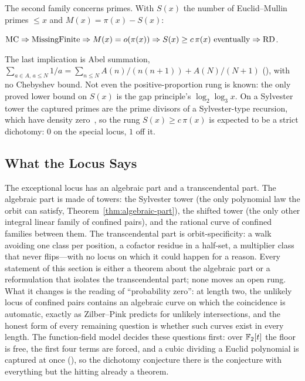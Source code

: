 The second family concerns primes.  With $S(x)$ the number of
Euclid--Mullin primes $\leq x$ and $M(x) = \pi(x) - S(x)$:

\begin{theorem}
\label{thm:coverage-ladder}
$\mathrm{MC} \Rightarrow \mathrm{MissingFinite} \Rightarrow M(x) = o(\pi(x))
\Rightarrow S(x) \geq c\,\pi(x)\ \text{eventually} \Rightarrow \mathrm{RD}$.
\end{theorem}

The last implication is Abel summation, $\sum_{a \in A,\, a \leq N} 1/a =
\sum_{n \leq N} A(n)/(n(n{+}1)) + A(N)/(N{+}1)$
(), with no
Chebyshev bound.  Not even the positive-proportion rung is known: the only
proved lower bound on $S(x)$ is the gap principle's $\log_2\log_3 x$.  On a
Sylvester tower the captured primes are the prime divisors of a
Sylvester-type recursion, which have density zero~\cite{Odoni1985}, so the
rung $S(x) \geq c\,\pi(x)$ is expected to be a strict dichotomy: $0$ on the
special locus, $1$ off it.

\subsection{What the Locus Says}
\label{sec:exceptional-verdict}

The exceptional locus has an algebraic part and a transcendental part.
The algebraic part is made of towers: the Sylvester tower (the only
polynomial law the orbit can satisfy, Theorem~\ref{thm:algebraic-part}),
the shifted tower (the only other integral linear family of confined
pairs), and the rational curve of confined families between them.  The
transcendental part is orbit-specificity: a walk avoiding one class per
position, a cofactor residue in a half-set, a multiplier class that never
flips---with no locus on which it could happen for a reason.  Every
statement of this section is either a theorem about the algebraic part or
a reformulation that isolates the transcendental part; none moves an open
rung.  What it changes is the reading of ``probability zero'': at length
two, the unlikely locus of confined pairs contains an algebraic curve on
which the coincidence is automatic, exactly as Zilber--Pink predicts for
unlikely intersections, and the honest form of every remaining question is
whether such curves exist in every length.  The function-field model
decides these questions first: over $\mathbb{F}_2[t]$ the floor is free, the
first four terms are forced, and a cubic dividing a Euclid polynomial is
captured at once
(), so the
dichotomy conjecture there is the conjecture with everything but the
hitting already a theorem.
